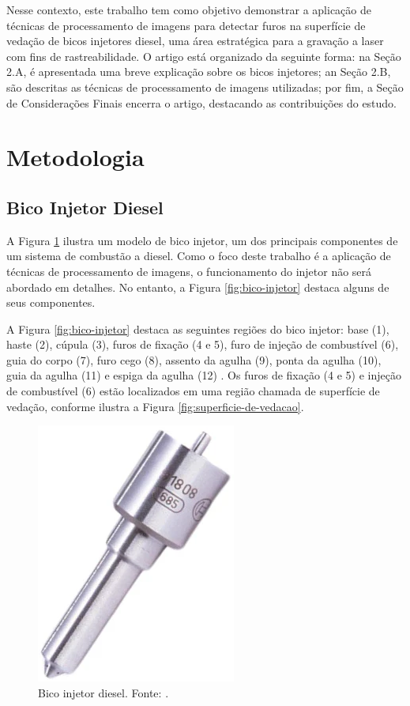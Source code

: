 \documentclass[conference]{IEEEtran}
\begin{document}
Nesse contexto, este trabalho tem como objetivo demonstrar a aplicação de técnicas de processamento de imagens para detectar furos na superfície de vedação de bicos injetores diesel, uma área estratégica para a gravação a laser com fins de rastreabilidade. O artigo está organizado da seguinte forma: na Seção 2.A, é apresentada uma breve explicação sobre os bicos injetores; an Seção 2.B, são descritas as técnicas de processamento de imagens utilizadas; por fim, a Seção de Considerações Finais encerra o artigo, destacando as contribuições do estudo.

\section{Metodologia}
\subsection{Bico Injetor Diesel}

A Figura \ref{fig:bico-injetor-real} ilustra um modelo de bico injetor, um dos principais componentes de um sistema de combustão a diesel. Como o foco deste trabalho é a aplicação de técnicas de processamento de imagens, o funcionamento do injetor não será abordado em detalhes. No entanto, a Figura \ref{fig:bico-injetor} destaca alguns de seus componentes.

A Figura \ref{fig:bico-injetor} destaca as seguintes regiões do bico injetor: base (1), haste (2), cúpula (3), furos de fixação (4 e 5), furo de injeção de combustível (6), guia do corpo (7), furo cego (8), assento da agulha (9), ponta da agulha (10), guia da agulha (11) e espiga da agulha (12) \cite{Girotto2023}. Os furos de fixação (4 e 5) e injeção de combustível (6) estão localizados em uma região chamada de superfície de vedação, conforme ilustra a Figura \ref{fig:superficie-de-vedacao}.

\begin{figure}[t]
 	\centering
 	\includegraphics[scale=0.5]{Images/bico-injetor-real.png}
 	\caption{Bico injetor diesel. Fonte: \cite{karhub}.}
 	\label{fig:bico-injetor-real}
\end{figure}
 
\end{document}

